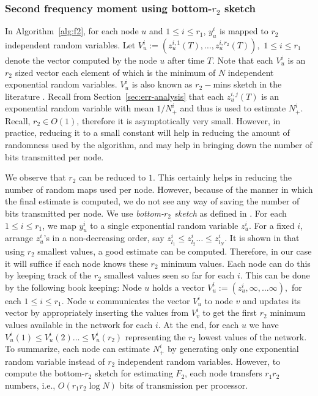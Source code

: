 \documentclass[10pt,twosided,a4paper,draft,onecolumn]{article}
\begin{document}
\subsubsection{Second frequency moment using bottom-$r_2$ sketch}
\label{sec:bottom_sketch}

In Algorithm~\ref{alg:f2}, for each node $u$ and $1 \leq i \leq r_1$,
$y_u^i$ is mapped to $r_2$ independent random variables. Let $V_u^i :=
(z_u^{i,1}(T), \ldots ,z_u^{i,r_2}(T)),$ $1 \leq i \leq r_1$ denote
the vector computed by the node $u$ after time $T.$ Note that each
$V_u^i$ is an $r_2$ sized vector each element of which is the minimum
of $N$ independent exponential random variables. $V_u^i$ is also known
as $r_2-$mins sketch in the literature \cite{Cohen07}. Recall from
Section~\ref{sec:err-analysis} that each $z_u^{i,j}(T)$ is an
exponential random variable with mean $1/N_+^i$ and thus is used to
estimate $N_+^i.$ Recall, $r_2 \in O(1)$, therefore it is
asymptotically very small. However, in practice, reducing it to a
small constant will help in reducing the amount of randomness used by
the algorithm, and may help in bringing down the number of bits
transmitted per node.

We observe that $r_2$ can be reduced to $1$. This certainly helps in
reducing the number of random maps used per node. However, because of
the manner in which the final estimate is computed, we do not see any
way of saving the number of bits transmitted per node. We use
\emph{bottom-$r_2$ sketch} as defined in \cite{Cohen07}. For each $1
\leq i \leq r_1$, we map $y_u^i$ to a single exponential random
variable $z_u^i$. For a fixed $i$, arrange $z_u^i$'s in a
non-decreasing order, say $z_{l_1}^i \leq z_{l_2}^i \ldots \leq
z_{l_N}^i$. It is shown in \cite{Cohen07} that using $r_2$ smallest
values, a good estimate can be computed.  Therefore, in our case it
will suffice if each node knows these $r_2$ minimum values.  Each node
can do this by keeping track of the $r_2$ smallest values seen so far
for each $i$. This can be done by the following book keeping: Node $u$
holds a vector $V_u^i := (z_u^{i} , \infty, \ldots \infty),$ for each
$1 \leq i \leq r_1$. Node $u$ communicates the vector $V_u^i$ to node
$v$ and updates its vector by appropriately inserting the values from
$V_v^i$ to get the first $r_2$ minimum values available in the network
for each $i.$ At the end, for each $u$ we have $V_u^i(1) \leq V_u^i(2)
\ldots \leq V_u^i(r_2)$ representing the $r_2$ lowest values of the
network. To summarize, each node can estimate $N_+^i$ by generating
only one exponential random variable instead of $r_2$ independent
random variables. However, to compute the bottom-$r_2$ sketch for
estimating $F_2$, each node transfers $r_1r_2$ numbers, i.e.,
$O(r_1r_2\log N)$ bits of transmission per processor.
\end{document}
